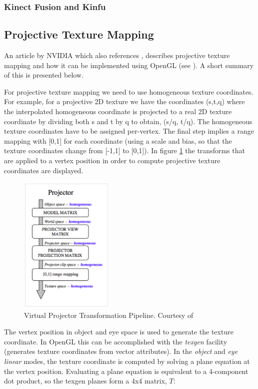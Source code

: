 \documentclass[]{article}
\begin{document}
\subsubsection{Kinect Fusion and Kinfu}

\subsection{Projective Texture Mapping}

An article by NVIDIA which also references \cite{segal92}, describes projective texture mapping and how it can be implemented using OpenGL (see \cite{cassNvidia}). A short summary of this is presented below.

For projective texture mapping we need to use homogeneous texture coordinates. For example, for a projective 2D texture we have the coordinates (s,t,q) where the interpolated homogeneous coordinate is projected to a real 2D texture coordinate by dividing both s and t by q to obtain, (s/q, t/q). The homogeneous texture coordinates have to be assigned per-vertex. The final step implies a range mapping with [0,1] for each coordinate (using a scale and bias, so that the texture coordinates change from [-1,1] to [0,1]). In figure \ref{fig:VirtualProjectorPipeline} the transforms that are applied to a vertex position in order to compute projective texture coordinates are displayed.

\begin{figure}[hbtp]
    \centering
    \includegraphics[width=0.4\textwidth]{figures/VirtualProjectorPipeline.PNG}
    \caption{Virtual Projector Transformation Pipeline. Courtesy of \cite{cassNvidia}}
    \label{fig:VirtualProjectorPipeline}
\end{figure}

The vertex position in object and eye space is used to generate the texture coordinate. In OpenGL this can be accomplished with the \textit{texgen} facility (generates texture coordinates from vector attributes). In the \textit{object} and \textit{eye linear} modes, the texture coordinate is computed by solving a plane equation at the vertex position. Evaluating a plane equation is equivalent to a 4-component dot product, so the texgen planes form a 4x4 matrix, $T$:
\end{document}
